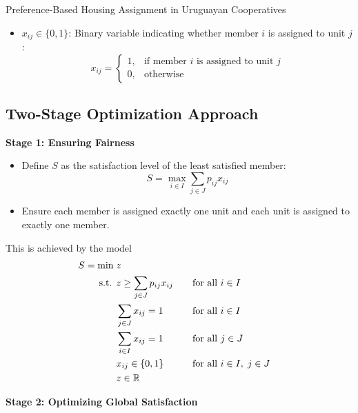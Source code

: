 \begin{casestudybox}{Preference-Based Housing Assignment in Uruguayan Cooperatives}
\begin{itemize}
    \item $x_{ij} \in \{0,1\}$: Binary variable indicating whether member $i$ is assigned to unit $j$:
    \[
    x_{ij} =
    \begin{cases} 
        1, & \text{if member } i \text{ is assigned to unit } j \\ 
        0, & \text{otherwise} 
    \end{cases}
    \]
\end{itemize}

\subsection*{Two-Stage Optimization Approach}

\textbf{Stage 1: Ensuring Fairness}

\begin{itemize}
    \item Define $S$ as the satisfaction level of the least satisfied member:
    \[ S = \max_{i \in I} \sum_{j \in J} p_{ij} x_{ij} \]
    \item Ensure each member is assigned exactly one unit and each unit is assigned to exactly one member.
\end{itemize}
This is achieved by the model
\begin{align*}
    S = \min \; & z \\
\mbox{ s.t. }        & z \geq \sum_{j \in J} p_{i j} x_{i j} &&\quad \mbox{for all } i \in I \\
                 & \sum_{j \in J} x_{i j} = 1 &&\quad \mbox{for all } i \in I \\
                 & \sum_{i \in I} x_{i j} = 1 &&\quad \mbox{for all } j \in J \\
                 & x_{i j} \in \{0,1\} &&\quad \mbox{for all } i \in I, \; j \in J \\
                 & z \in \mathbb{R}
\end{align*}

\textbf{Stage 2: Optimizing Global Satisfaction}


\end{casestudybox}

